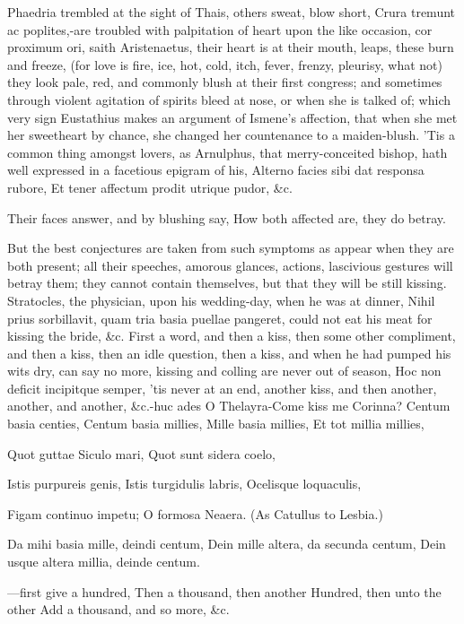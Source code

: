 {Phaedria trembled at the sight of Thais, others sweat, blow short,
Crura tremunt ac poplites,-are troubled with palpitation of heart upon
the like occasion, cor proximum ori, saith Aristenaetus, their
heart is at their mouth, leaps, these burn and freeze, (for love is
fire, ice, hot, cold, itch, fever, frenzy, pleurisy, what not) they
look pale, red, and commonly blush at their first congress; and
sometimes through violent agitation of spirits bleed at nose, or when
she is talked of; which very sign Eustathius makes an argument of
Ismene's affection, that when she met her sweetheart by chance, she
changed her countenance to a maiden-blush. 'Tis a common thing amongst
lovers, as Arnulphus, that merry-conceited bishop, hath well
expressed in a facetious epigram of his,
Alterno facies sibi dat responsa rubore,
Et tener affectum prodit utrique pudor, \&c.

Their faces answer, and by blushing say,
How both affected are, they do betray.

But the best conjectures are taken from such symptoms as appear when
they are both present; all their speeches, amorous glances, actions,
lascivious gestures will betray them; they cannot contain themselves,
but that they will be still kissing. Stratocles, the physician,
upon his wedding-day, when he was at dinner, Nihil prius sorbillavit,
quam tria basia puellae pangeret, could not eat his meat for kissing
the bride, \&c. First a word, and then a kiss, then some other
compliment, and then a kiss, then an idle question, then a kiss, and
when he had pumped his wits dry, can say no more, kissing and colling
are never out of season, Hoc non deficit incipitque semper, 'tis
never at an end, another kiss, and then another, another, and
another, \&c.-huc ades O Thelayra-Come kiss me Corinna?
Centum basia centies,
Centum basia millies,
Mille basia millies,
Et tot millia millies,

Quot guttae Siculo mari,
Quot sunt sidera coelo,

Istis purpureis genis,
Istis turgidulis labris,
Ocelisque loquaculis,

Figam continuo impetu;
O formosa Neaera. (As Catullus to Lesbia.)

Da mihi basia mille, deindi centum,
Dein mille altera, da secunda centum,
Dein usque altera millia, deinde centum.

---first give a hundred,
Then a thousand, then another
Hundred, then unto the other
Add a thousand, and so more, \&c.

}
